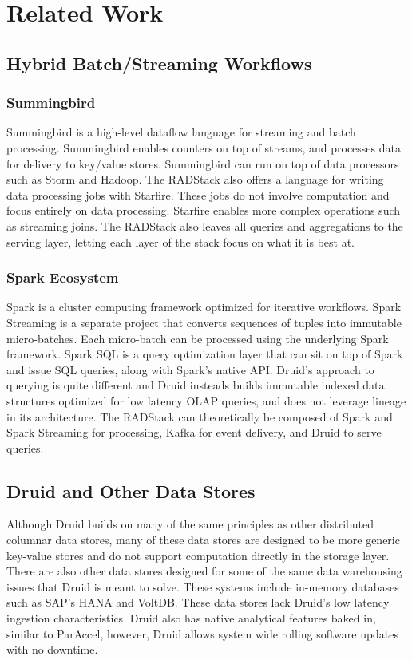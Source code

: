 \documentclass{vldb}
\begin{document}
\section{Related Work}
\label{sec:related}

\subsection{Hybrid Batch/Streaming Workflows}

\subsubsection{Summingbird}
Summingbird\cite{boykin2014summingbird} is a high-level dataflow language for
streaming and batch processing. Summingbird enables counters on top of streams,
and processes data for delivery to key/value stores. Summingbird can run on top
of data processors such as Storm\cite{marz2013storm} and Hadoop. The RADStack
also offers a language for writing data processing jobs with Starfire. These
jobs do not involve computation and focus entirely on data processing. Starfire
enables more complex operations such as streaming joins. The RADStack also 
leaves all queries and aggregations to the serving layer, letting each layer of
the stack focus on what it is best at.

\subsubsection{Spark Ecosystem}
Spark\cite{zaharia2012resilient} is a cluster computing framework optimized for
iterative workflows.  Spark Streaming is a separate project that converts
sequences of tuples into immutable micro-batches. Each micro-batch can be
processed using the underlying Spark framework. Spark SQL is a query
optimization layer that can sit on top of Spark and issue SQL queries, along
with Spark’s native API.  Druid’s approach to querying is quite
different and Druid insteads builds immutable indexed data structures optimized
for low latency OLAP queries, and does not leverage lineage in its architecture.
The RADStack can theoretically be composed of Spark and Spark Streaming for
processing, Kafka for event delivery, and Druid to serve queries.

\subsection{Druid and Other Data Stores}
Although Druid builds on many of the same principles as other distributed
columnar data stores\cite{fink2012distributed}, many of these data stores are
designed to be more generic key-value stores\cite{lakshman2010cassandra} and do
not support computation directly in the storage layer. There are also other
data stores designed for some of the same data warehousing issues that Druid is
meant to solve. These systems include in-memory databases such as SAP’s
HANA\cite{farber2012sap} and VoltDB\cite{voltdb2010voltdb}. These data stores
lack Druid’s low latency ingestion characteristics. Druid also has native
analytical features baked in, similar to ParAccel\cite{paraccel2013}, however,
Druid allows system wide rolling software updates with no downtime. 
\end{document}
